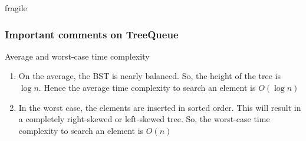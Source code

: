 \documentclass{beamer}
\begin{document}
\begin{frame}{fragile}
\frametitle{Important comments on TreeQueue}
\begin{block}{Average and worst-case time complexity}
\begin{enumerate}
\item On the average, the BST is nearly balanced. So, the height of the tree is $\log n$. Hence the  average time complexity to search an element is $O(\log n)$
\item In the worst case, the elements are inserted in sorted order. This will result in a completely right-skewed or left-skewed tree. So, the worst-case time complexity to search an element is $O(n)$
\end{enumerate}
\end{block}

\end{frame}
\end{document}
